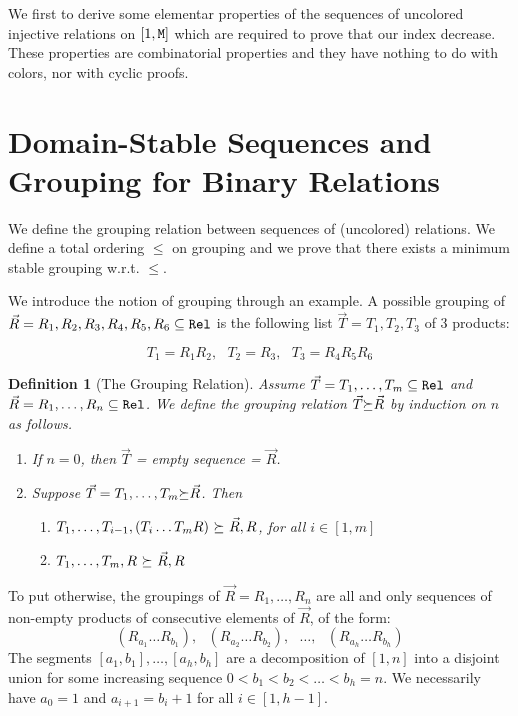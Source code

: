 \documentclass{lmcs}
\newtheorem{definition}[theorem]{Definition}
\begin{document}
We first to derive some elementar properties 
of the sequences of uncolored injective relations on $[1,{\tt M}]$ which are required to
prove that our index decrease. These properties are combinatorial properties and they 
have nothing to do with colors, nor with cyclic proofs.




\section{Domain-Stable Sequences and Grouping for Binary Relations}
We define the grouping relation between sequences of (uncolored) relations. We define
a total ordering $\le$ on grouping and we prove that there exists a minimum stable
grouping w.r.t. $\le$.

We introduce the notion of grouping through an example.
A possible grouping of $\vec{R} = R_1, R_2, R_3, R_4, R_5, R_6 \subseteq {\tt Rel}$ 
is the following list $\vec{T} = T_1, T_2, T_3$ of $3$ products:
 
$$ 
T_1 = R_1R_2, \ \ \ 
T_2 = R_3, \ \ \ 
T_3 = R_4 R_5 R_6
$$

\begin{definition}[The Grouping Relation]
Assume $\vec{T} = T_1, \ldots, T_m  \subseteq {\tt Rel}$ and 
$\vec{R} = R_1, \ldots, R_n  \subseteq {\tt Rel}$. 
We define the grouping relation $\vec{T} {\succeq} \vec{R}$ by induction on $n$ as follows.
\begin{enumerate}

\item
If $n=0$, then $\vec{T}$ = empty sequence = $\vec{R}$.

\item
Suppose $\vec{T} = T_1, \ldots, T_m {\succeq} \vec{R}$. 
Then 
\begin{enumerate}
\item $T_1, \ldots, T_{i-1}, (T_i \ldots T_m R) \ {\succeq} \ \vec{R},R$, for all $i \in [1,m]$
\item $T_1, \ldots, T_{m}, R \ {\succeq} \ \vec{R},R$ 
\end{enumerate}
\end{enumerate}
\end{definition}

To put otherwise, the groupings of $\vec{R} = R_1, \ldots, R_n$ are all and only 
sequences of non-empty products of consecutive elements of $\vec{R}$, of the form: 
$$
(R_{a_1} \ldots R_{b_1}), \ \ \ 
(R_{a_2} \ldots R_{b_2}), \ \ \ 
\ldots, \ \ \ 
(R_{a_{h}} \ldots R_{b_{h}})
$$
The segments $[a_1,b_1], \ldots, [a_{h},b_{h}]$ are a decomposition
of $[1,n]$ into a disjoint union for some increasing sequence 
$0 < b_1 < b_2 <  \ldots < b_h = n$. We necessarily have
$a_0=1$ and $a_{i+1} = b_i + 1$ for all $i \in [1,h-1]$. 
\end{document}
